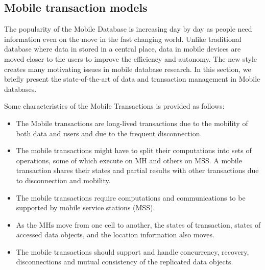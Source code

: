 \documentclass{sig-alternate-05-2015}
\begin{document}






\subsection{Mobile transaction models}
\label{sec:mobile}

The popularity of the Mobile Database is increasing day by day as
people need information even on the move in the fast changing
world. Unlike traditional database where data in stored in a central
place, data in mobile devices are moved closer to the users to improve
the efficiency and autonomy. The new style creates many motivating
issues in mobile database research. In this section, we briefly
present the state-of-the-art of data and transaction management in
Mobile databases.

Some characteristics of the Mobile Transactions is provided as
follows:

\begin{itemize}
\item The Mobile transactions are long-lived transactions due to the
  mobility of both data and users and due to the frequent
  disconnection.
\item The mobile transactions might have to split their computations
  into sets of operations, some of which execute on MH and others on
  MSS. A mobile transaction shares their states and partial results
  with other transactions due to disconnection and mobility.
\item The mobile transactions require computations and communications
  to be supported by mobile service stations (MSS).
\item As the MHs move from one cell to another, the states of
  transaction, states of accessed data objects, and the location
  information also moves.
\item The mobile transactions should support and handle concurrency,
  recovery, disconnections and mutual consistency of the replicated
  data objects.
\end{itemize}
\end{document}
